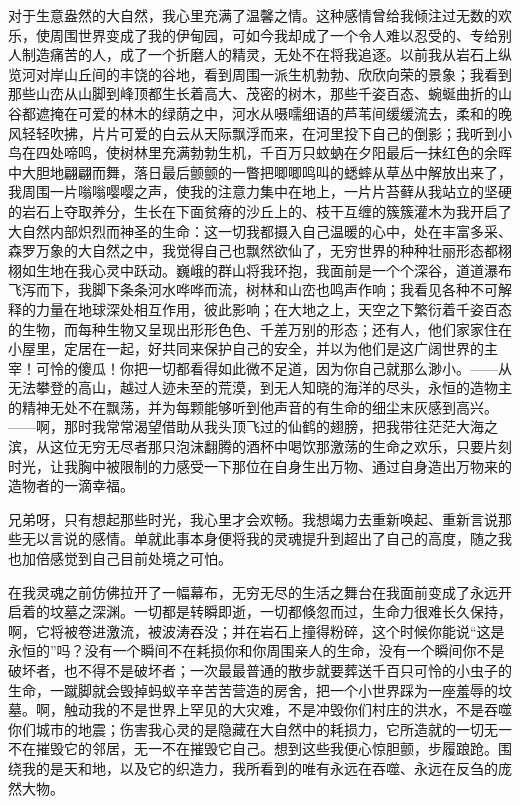 \documentclass[12pt,oneside]{book}
\begin{document}
对于生意盎然的大自然，我心里充满了温馨之情。这种感情曾给我倾注过无数的欢乐，使周围世界变成了我的伊甸园，可如今我却成了一个令人难以忍受的、专给别人制造痛苦的人，成了一个折磨人的精灵，无处不在将我追逐。以前我从岩石上纵览河对岸山丘间的丰饶的谷地，看到周围一派生机勃勃、欣欣向荣的景象；我看到那些山峦从山脚到峰顶都生长着高大、茂密的树木，那些千姿百态、蜿蜒曲折的山谷都遮掩在可爱的林木的绿荫之中，河水从嗫嚅细语的芦苇间缓缓流去，柔和的晚风轻轻吹拂，片片可爱的白云从天际飘浮而来，在河里投下自己的倒影；我听到小鸟在四处啼鸣，使树林里充满勃勃生机，千百万只蚊蚋在夕阳最后一抹红色的余晖中大胆地翩翩而舞，落日最后颤颤的一瞥把唧唧鸣叫的蟋蟀从草丛中解放出来了，我周围一片嗡嗡嘤嘤之声，使我的注意力集中在地上，一片片苔藓从我站立的坚硬的岩石上夺取养分，生长在下面贫瘠的沙丘上的、枝干互缠的簇簇灌木为我开启了大自然内部炽烈而神圣的生命：这一切我都摄入自己温暖的心中，处在丰富多采、森罗万象的大自然之中，我觉得自己也飘然欲仙了，无穷世界的种种壮丽形态都栩栩如生地在我心灵中跃动。巍峨的群山将我环抱，我面前是一个个深谷，道道瀑布飞泻而下，我脚下条条河水哗哗而流，树林和山峦也鸣声作响；我看见各种不可解释的力量在地球深处相互作用，彼此影响；在大地之上，天空之下繁衍着千姿百态的生物，而每种生物又呈现出形形色色、千差万别的形态；还有人，他们家家住在小屋里，定居在一起，好共同来保护自己的安全，并以为他们是这广阔世界的主宰！可怜的傻瓜！你把一切都看得如此微不足道，因为你自己就那么渺小。——从无法攀登的高山，越过人迹未至的荒漠，到无人知晓的海洋的尽头，永恒的造物主的精神无处不在飘荡，并为每颗能够听到他声音的有生命的细尘末灰感到高兴。——啊，那时我常常渴望借助从我头顶飞过的仙鹤的翅膀，把我带往茫茫大海之滨，从这位无穷无尽者那只泡沫翻腾的酒杯中喝饮那激荡的生命之欢乐，只要片刻时光，让我胸中被限制的力感受一下那位在自身生出万物、通过自身造出万物来的造物者的一滴幸福。

兄弟呀，只有想起那些时光，我心里才会欢畅。我想竭力去重新唤起、重新言说那些无以言说的感情。单就此事本身便将我的灵魂提升到超出了自己的高度，随之我也加倍感觉到自己目前处境之可怕。

在我灵魂之前仿佛拉开了一幅幕布，无穷无尽的生活之舞台在我面前变成了永远开启着的坟墓之深渊。一切都是转瞬即逝，一切都倏忽而过，生命力很难长久保持，啊，它将被卷进激流，被波涛吞没；并在岩石上撞得粉碎，这个时候你能说“这是永恒的”吗？没有一个瞬间不在耗损你和你周围亲人的生命，没有一个瞬间你不是破坏者，也不得不是破坏者；一次最最普通的散步就要葬送千百只可怜的小虫子的生命，一蹴脚就会毁掉蚂蚁辛辛苦苦营造的房舍，把一个小世界踩为一座羞辱的坟墓。啊，触动我的不是世界上罕见的大灾难，不是冲毁你们村庄的洪水，不是吞噬你们城市的地震；伤害我心灵的是隐藏在大自然中的耗损力，它所造就的一切无一不在摧毁它的邻居，无一不在摧毁它自己。想到这些我便心惊胆颤，步履踉跄。围绕我的是天和地，以及它的织造力，我所看到的唯有永远在吞噬、永远在反刍的庞然大物。
\end{document}
